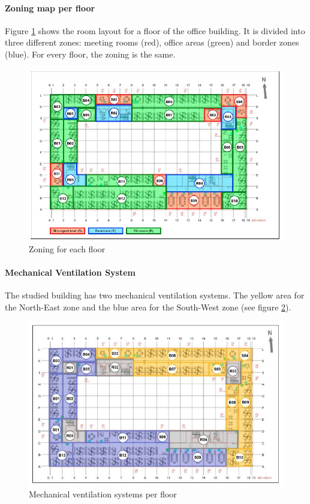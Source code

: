 \paragraph{Zoning map per floor} Figure \ref{fig:zoning} shows the room layout for a floor of the office building. It is divided into three different zones: meeting rooms (red), office areas (green) and border zones (blue). For every floor, the zoning is the same.

\begin{figure}[h!]
  \vspace{0.5em} %
  \includegraphics[scale=0.6]{Figures/zoning.jpg}
  \caption{Zoning for each floor \cite{roman2015}}  
  \label{fig:zoning}
\end{figure}

\paragraph{Mechanical Ventilation System} The studied building has two mechanical ventilation systems. The yellow area for the North-East zone and the blue area for the South-West zone (see figure \ref{fig:ventilation}). 

\begin{figure}[h!]
  \vspace{0.5em} %
  \includegraphics[scale=0.6]{Figures/ventilation.jpg}
  \caption{Mechanical ventilation systems per floor \cite{roman2015}}  
  \label{fig:ventilation}
\end{figure}

